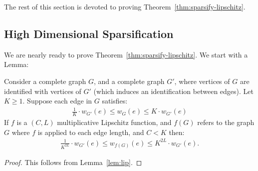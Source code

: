 The rest of this section is devoted to proving Theorem~\ref{thm:sparsify-lipschitz}.
\subsection{High Dimensional Sparsification}

We are nearly ready to prove Theorem~\ref{thm:sparsify-lipschitz}. We start with a Lemma:



\begin{lemma}\label{lem:lipschitz-distortion} 
Consider a complete graph $G$, and a complete graph $G'$, where vertices of $G$ are identified with vertices of $G'$ (which induces an identification between edges). Let $K \geq 1$. Suppose each edge in $G$ satisfies:
\begin{align*} 
\frac{1}{K} \cdot w_{G'}(e) \leq w_G(e) \leq K \cdot w_{G'}(e) 
\end{align*}
If $f$ is a $(C, L)$ multiplicative Lipschitz function, and $f(G)$ refers to the graph $G$ where $f$ is applied to each edge length, and $C < K$ then: 
\begin{align*}
\frac{1}{K^{2L}} \cdot w_{G'}(e) \leq w_{f(G)}(e) \leq K^{2L} \cdot w_{G'}(e).
\end{align*}
\end{lemma}
\begin{proof} 
This follows from Lemma~\ref{lem:lip}.
\end{proof}



